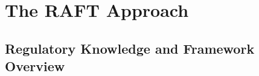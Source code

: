 \section{The RAFT Approach}
\label{sec:method}


\subsection{Regulatory Knowledge and Framework Overview}







